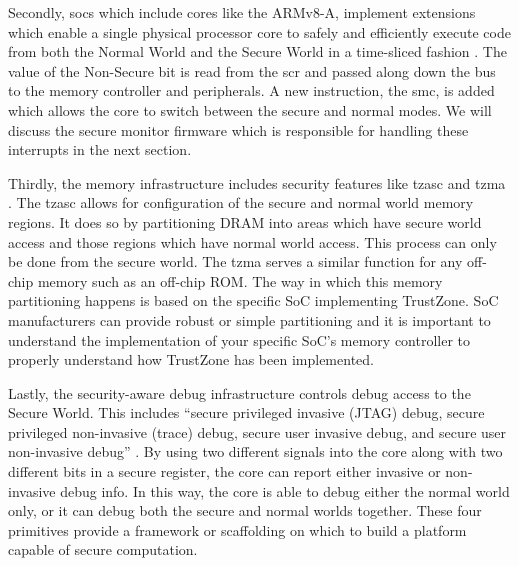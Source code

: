 Secondly, \gls{soc}s which include cores like the ARMv8-A, implement extensions which enable a single physical processor core to safely and efficiently execute code from both the Normal World and the Secure World in a time-sliced fashion \cite{TrustZoneExplained}. The value of the Non-Secure bit is read from the \gls{scr} and passed along down the bus to the memory controller and peripherals. A new instruction, the \gls{smc}, is added which allows the core to switch between the secure and normal modes. We will discuss the secure monitor firmware which is responsible for handling these interrupts in the next section.

Thirdly, the memory infrastructure includes security features like \gls{tzasc} and \gls{tzma} \cite{TrustZoneExplained}. The \gls{tzasc} allows for configuration of the secure and normal world memory regions. It does so by partitioning DRAM into areas which have secure world access and those regions which have normal world access. This process can only be done from the secure world. The \gls{tzma} serves a similar function for any off-chip memory such as an off-chip ROM. The way in which this memory partitioning happens is based on the specific SoC implementing TrustZone. SoC manufacturers can provide robust or simple partitioning and it is important to understand the implementation of your specific SoC's memory controller to properly understand how TrustZone has been implemented.

Lastly, the security-aware debug infrastructure controls debug access to the Secure World. This includes ``secure privileged invasive (JTAG) debug, secure privileged non-invasive (trace) debug, secure user invasive debug, and secure user non-invasive debug'' \cite{ArmBuildingSS}. By using two different signals into the core along with two different bits in a secure register, the core can report either invasive or non-invasive debug info. In this way, the core is able to debug either the normal world only, or it can debug both the secure and normal worlds together. These four primitives provide a framework or scaffolding on which to build a platform capable of secure computation.


